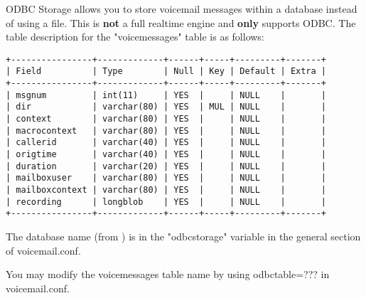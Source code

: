 

ODBC Storage allows you to store voicemail messages within a database 
instead of using a file.  This is \textbf{not} a full realtime engine and 
\textbf{only} supports ODBC.  The table description for the "voicemessages" 
table is as follows:

\begin{verbatim}
+----------------+-------------+------+-----+---------+-------+
| Field          | Type        | Null | Key | Default | Extra |
+----------------+-------------+------+-----+---------+-------+
| msgnum         | int(11)     | YES  |     | NULL    |       |
| dir            | varchar(80) | YES  | MUL | NULL    |       |
| context        | varchar(80) | YES  |     | NULL    |       |
| macrocontext   | varchar(80) | YES  |     | NULL    |       |
| callerid       | varchar(40) | YES  |     | NULL    |       |
| origtime       | varchar(40) | YES  |     | NULL    |       |
| duration       | varchar(20) | YES  |     | NULL    |       |
| mailboxuser    | varchar(80) | YES  |     | NULL    |       |
| mailboxcontext | varchar(80) | YES  |     | NULL    |       |
| recording      | longblob    | YES  |     | NULL    |       |
+----------------+-------------+------+-----+---------+-------+
\end{verbatim}

The database name (from ) is in the 
"odbcstorage" variable in the general section of voicemail.conf.

You may modify the voicemessages table name by using 
odbctable=??? in voicemail.conf.


